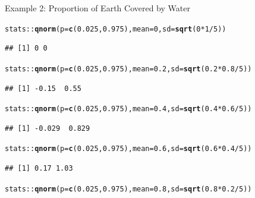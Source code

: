 \documentclass[10pt]{beamer}\usepackage[]{graphicx}\usepackage[]{color}
\makeatletter
\newcommand{\hlnum}[1]{\textcolor[rgb]{0.686,0.059,0.569}{#1}}%
\newcommand{\hlopt}[1]{\textcolor[rgb]{0,0,0}{#1}}%
\newcommand{\hlstd}[1]{\textcolor[rgb]{0.345,0.345,0.345}{#1}}%
\newcommand{\hlkwc}[1]{\textcolor[rgb]{0.333,0.667,0.333}{#1}}%
\newcommand{\hlkwd}[1]{\textcolor[rgb]{0.737,0.353,0.396}{\textbf{#1}}}%
\newenvironment{kframe}{%
 \def\at@end@of@kframe{}%
 \ifinner\ifhmode%
  \def\at@end@of@kframe{\end{minipage}}%
  \begin{minipage}{\columnwidth}%
 \fi\fi%
 \def\FrameCommand##1{\hskip\@totalleftmargin \hskip-\fboxsep
 \colorbox{shadecolor}{##1}\hskip-\fboxsep
     \hskip-\linewidth \hskip-\@totalleftmargin \hskip\columnwidth}%
 \MakeFramed {\advance\hsize-\width
   \@totalleftmargin\z@ \linewidth\hsize
   \@setminipage}}%
 {\par\unskip\endMakeFramed%
 \at@end@of@kframe}
\newenvironment{knitrout}{}{} %
\makeatother
\begin{document}
\begin{frame}[fragile]{Example 2: Proportion of Earth Covered by Water}
	
\begin{knitrout}\tiny
{}\color{fgcolor}\begin{kframe}
\begin{alltt}
\hlstd{stats}\hlopt{::}\hlkwd{qnorm}\hlstd{(}\hlkwc{p}\hlstd{=}\hlkwd{c}\hlstd{(}\hlnum{0.025}\hlstd{,}\hlnum{0.975}\hlstd{),} \hlkwc{mean} \hlstd{=} \hlnum{0}\hlstd{,} \hlkwc{sd} \hlstd{=} \hlkwd{sqrt}\hlstd{(}\hlnum{0} \hlopt{*} \hlnum{1} \hlopt{/} \hlnum{5}\hlstd{))}
\end{alltt}
\begin{verbatim}
## [1] 0 0
\end{verbatim}
\begin{alltt}
\hlstd{stats}\hlopt{::}\hlkwd{qnorm}\hlstd{(}\hlkwc{p}\hlstd{=}\hlkwd{c}\hlstd{(}\hlnum{0.025}\hlstd{,}\hlnum{0.975}\hlstd{),} \hlkwc{mean} \hlstd{=} \hlnum{0.2}\hlstd{,} \hlkwc{sd} \hlstd{=} \hlkwd{sqrt}\hlstd{(}\hlnum{0.2} \hlopt{*} \hlnum{0.8} \hlopt{/} \hlnum{5}\hlstd{))}
\end{alltt}
\begin{verbatim}
## [1] -0.15  0.55
\end{verbatim}
\begin{alltt}
\hlstd{stats}\hlopt{::}\hlkwd{qnorm}\hlstd{(}\hlkwc{p}\hlstd{=}\hlkwd{c}\hlstd{(}\hlnum{0.025}\hlstd{,}\hlnum{0.975}\hlstd{),} \hlkwc{mean} \hlstd{=} \hlnum{0.4}\hlstd{,} \hlkwc{sd} \hlstd{=} \hlkwd{sqrt}\hlstd{(}\hlnum{0.4} \hlopt{*} \hlnum{0.6} \hlopt{/} \hlnum{5}\hlstd{))}
\end{alltt}
\begin{verbatim}
## [1] -0.029  0.829
\end{verbatim}
\begin{alltt}
\hlstd{stats}\hlopt{::}\hlkwd{qnorm}\hlstd{(}\hlkwc{p}\hlstd{=}\hlkwd{c}\hlstd{(}\hlnum{0.025}\hlstd{,}\hlnum{0.975}\hlstd{),} \hlkwc{mean} \hlstd{=} \hlnum{0.6}\hlstd{,} \hlkwc{sd} \hlstd{=} \hlkwd{sqrt}\hlstd{(}\hlnum{0.6} \hlopt{*} \hlnum{0.4} \hlopt{/} \hlnum{5}\hlstd{))}
\end{alltt}
\begin{verbatim}
## [1] 0.17 1.03
\end{verbatim}
\begin{alltt}
\hlstd{stats}\hlopt{::}\hlkwd{qnorm}\hlstd{(}\hlkwc{p}\hlstd{=}\hlkwd{c}\hlstd{(}\hlnum{0.025}\hlstd{,}\hlnum{0.975}\hlstd{),} \hlkwc{mean} \hlstd{=} \hlnum{0.8}\hlstd{,} \hlkwc{sd} \hlstd{=} \hlkwd{sqrt}\hlstd{(}\hlnum{0.8} \hlopt{*} \hlnum{0.2} \hlopt{/} \hlnum{5}\hlstd{))}

\end{alltt}
\end{kframe}
\end{knitrout}
\end{frame}
\end{document}
